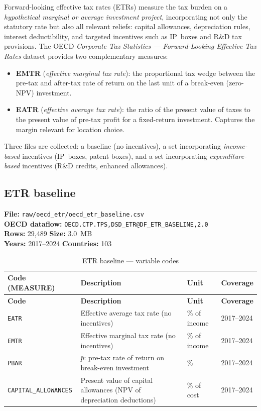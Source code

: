 \documentclass[11pt,a4paper]{article}
\newcommand{\code}[1]{\texttt{#1}}
\begin{document}
Forward-looking effective tax rates (ETRs) measure the tax burden on a
\emph{hypothetical marginal or average investment project}, incorporating not
only the statutory rate but also all relevant reliefs: capital allowances,
depreciation rules, interest deductibility, and targeted incentives such as
IP~boxes and R\&D tax provisions.  The OECD \emph{Corporate Tax Statistics ---
Forward-Looking Effective Tax Rates} dataset provides two complementary measures:

\begin{itemize}[noitemsep]
    \item \textbf{EMTR} (\emph{effective marginal tax rate}): the proportional tax
    wedge between the pre-tax and after-tax rate of return on the last unit of a
    break-even (zero-NPV) investment.
    \item \textbf{EATR} (\emph{effective average tax rate}): the ratio of the
    present value of taxes to the present value of pre-tax profit for a
    fixed-return investment.  Captures the margin relevant for location choice.
\end{itemize}

Three files are collected: a baseline (no incentives), a set incorporating
\emph{income-based} incentives (IP~boxes, patent boxes), and a set incorporating
\emph{expenditure-based} incentives (R\&D credits, enhanced allowances).

\subsection{ETR baseline}

\textbf{File:} \texttt{raw/oecd\_etr/oecd\_etr\_baseline.csv}\\
\textbf{OECD dataflow:} \texttt{OECD.CTP.TPS,DSD\_ETR@DF\_ETR\_BASELINE,2.0}\\
\textbf{Rows:} 29{,}489 \quad \textbf{Size:} 3.0~MB\\
\textbf{Years:} 2017--2024 \quad \textbf{Countries:} 103

\begin{longtable}{@{}L{3.2cm} L{6.0cm} C{2.0cm} C{2.5cm}@{}}
\caption{ETR baseline --- variable codes}\label{tab:etr_baseline}\\
\toprule
\textbf{Code (MEASURE)} & \textbf{Description} & \textbf{Unit} & \textbf{Coverage} \\
\midrule
\endfirsthead
\toprule
\textbf{Code} & \textbf{Description} & \textbf{Unit} & \textbf{Coverage} \\
\midrule
\endhead
\bottomrule
\endlastfoot
\code{EATR}               & Effective average tax rate (no incentives) & \% of income & 2017--2024 \\
\code{EMTR}               & Effective marginal tax rate (no incentives) & \% of income & 2017--2024 \\
\code{PBAR}               & $\bar{p}$: pre-tax rate of return on break-even investment & \% & 2017--2024 \\
\code{CAPITAL\_ALLOWANCES}& Present value of capital allowances (NPV of depreciation deductions) & \% of cost & 2017--2024 \\
\end{longtable}
\end{document}
